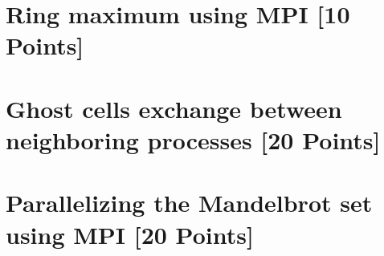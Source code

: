 \documentclass[unicode,11pt,a4paper,oneside,numbers=endperiod,openany]{scrartcl}
\begin{document}
\setassignment
{}

\newline

\assignmentpolicy


\section{Ring maximum using MPI [10 Points]}


\section{Ghost cells exchange between neighboring processes [20 Points]}


\section{Parallelizing the Mandelbrot set using MPI [20 Points]}



\end{document}
